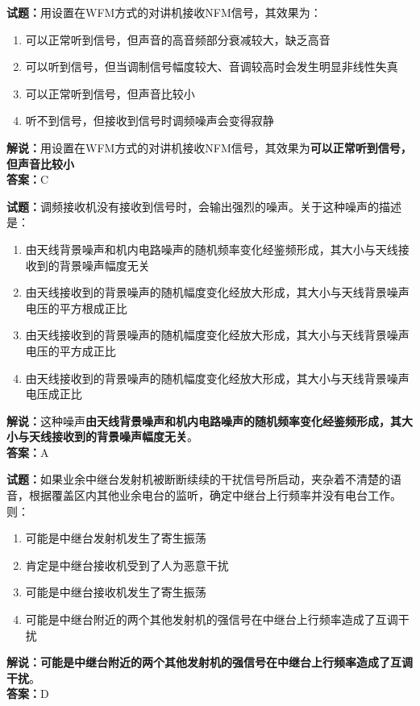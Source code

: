 \documentclass{ctexbook}
\begin{document}
\bigskip


\noindent\textbf{试题：}用设置在WFM方式的对讲机接收NFM信号，其效果为：
\begin{enumerate}[leftmargin=3em]
\item 可以正常听到信号，但声音的高音频部分衰减较大，缺乏高音
\item 可以听到信号，但当调制信号幅度较大、音调较高时会发生明显非线性失真
\item 可以正常听到信号，但声音比较小
\item 听不到信号，但接收到信号时调频噪声会变得寂静
\end{enumerate}
\noindent\textbf{解说：}用设置在WFM方式的对讲机接收NFM信号，其效果为\textbf{可以正常听到信号，但声音比较小}\\\noindent\textbf{答案：}C



\bigskip


\noindent\textbf{试题：}调频接收机没有接收到信号时，会输出强烈的噪声。关于这种噪声的描述是：
\begin{enumerate}[leftmargin=3em]
\item 由天线背景噪声和机内电路噪声的随机频率变化经鉴频形成，其大小与天线接收到的背景噪声幅度无关
\item 由天线接收到的背景噪声的随机幅度变化经放大形成，其大小与天线背景噪声电压的平方根成正比
\item 由天线接收到的背景噪声的随机幅度变化经放大形成，其大小与天线背景噪声电压的平方成正比
\item 由天线接收到的背景噪声的随机幅度变化经放大形成，其大小与天线背景噪声电压成正比
\end{enumerate}
\noindent\textbf{解说：}这种噪声\textbf{由天线背景噪声和机内电路噪声的随机频率变化经鉴频形成，其大小与天线接收到的背景噪声幅度无关}。\\\noindent\textbf{答案：}A


\bigskip


\noindent\textbf{试题：}如果业余中继台发射机被断断续续的干扰信号所启动，夹杂着不清楚的语音，根据覆盖区内其他业余电台的监听，确定中继台上行频率并没有电台工作。则：
\begin{enumerate}[leftmargin=3em]
\item 可能是中继台发射机发生了寄生振荡
\item 肯定是中继台接收机受到了人为恶意干扰
\item 可能是中继台接收机发生了寄生振荡
\item 可能是中继台附近的两个其他发射机的强信号在中继台上行频率造成了互调干扰
\end{enumerate}
\noindent\textbf{解说：可能是中继台附近的两个其他发射机的强信号在中继台上行频率造成了互调干扰}。\\\noindent\textbf{答案：}D
\end{document}
